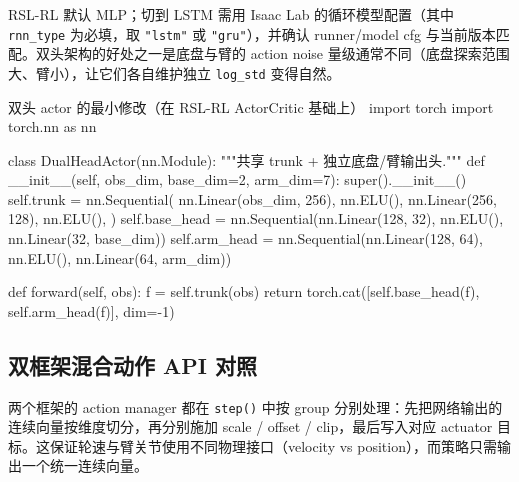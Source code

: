 RSL-RL 默认 MLP；切到 LSTM 需用 Isaac Lab 的循环模型配置（其中 \verb|rnn_type| 为必填，取 \verb|"lstm"| 或 \verb|"gru"|），并确认 runner/model cfg 与当前版本匹配。双头架构的好处之一是底盘与臂的 action noise 量级通常不同（底盘探索范围大、臂小），让它们各自维护独立 \verb|log_std| 变得自然。

\begin{codebox}[Python]{双头 actor 的最小修改（在 RSL-RL ActorCritic 基础上）}
import torch
import torch.nn as nn

class DualHeadActor(nn.Module):
    """共享 trunk + 独立底盘/臂输出头."""
    def __init__(self, obs_dim, base_dim=2, arm_dim=7):
        super().__init__()
        self.trunk = nn.Sequential(
            nn.Linear(obs_dim, 256), nn.ELU(),
            nn.Linear(256, 128), nn.ELU(),
        )
        self.base_head = nn.Sequential(nn.Linear(128, 32), nn.ELU(), nn.Linear(32, base_dim))
        self.arm_head  = nn.Sequential(nn.Linear(128, 64), nn.ELU(), nn.Linear(64, arm_dim))

    def forward(self, obs):
        f = self.trunk(obs)
        return torch.cat([self.base_head(f), self.arm_head(f)], dim=-1)
\end{codebox}

\subsection{双框架混合动作 API 对照}
\label{sec:rlmc-wh-action-api}

两个框架的 action manager 都在 \verb|step()| 中按 group 分别处理：先把网络输出的连续向量按维度切分，再分别施加 scale / offset / clip，最后写入对应 actuator 目标。这保证轮速与臂关节使用不同物理接口（velocity vs position），而策略只需输出一个统一连续向量。

